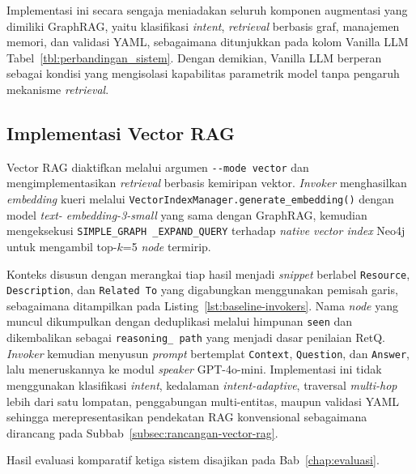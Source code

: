Implementasi ini secara sengaja meniadakan seluruh komponen augmentasi yang dimiliki GraphRAG, yaitu klasifikasi \textit{intent}, \textit{retrieval} berbasis graf, manajemen memori, dan validasi YAML, sebagaimana ditunjukkan pada kolom Vanilla LLM Tabel~\ref{tbl:perbandingan_sistem}. Dengan demikian, Vanilla LLM berperan sebagai kondisi yang mengisolasi kapabilitas parametrik model tanpa pengaruh mekanisme \textit{retrieval}.

\subsection{Implementasi Vector RAG}
\label{subsec:implementasi-vector-rag}

\begin{sloppypar}
Vector RAG diaktifkan melalui argumen \texttt{-{}-mode vector} dan mengimplementasikan \textit{retrieval} berbasis kemiripan vektor. \textit{Invoker} menghasilkan \textit{embedding} kueri melalui \texttt{VectorIndexManager.\allowbreak{}generate\_embedding()} dengan model \textit{text- embedding-3-small} yang sama dengan GraphRAG, kemudian mengeksekusi \texttt{SIMPLE\_GRAPH \_EXPAND\_QUERY} terhadap \textit{native vector index} Neo4j untuk mengambil top-$k$=5 \textit{node} termirip.
\end{sloppypar}

Konteks disusun dengan merangkai tiap hasil menjadi \textit{snippet} berlabel \texttt{Resource}, \texttt{Description}, dan \texttt{Related To} yang digabungkan menggunakan pemisah garis, sebagaimana ditampilkan pada Listing~\ref{lst:baseline-invokers}. Nama \textit{node} yang muncul dikumpulkan dengan deduplikasi melalui himpunan \texttt{seen} dan dikembalikan sebagai \texttt{reasoning\_ path} yang menjadi dasar penilaian RetQ. \textit{Invoker} kemudian menyusun \textit{prompt} bertemplat \texttt{Context}, \texttt{Question}, dan \texttt{Answer}, lalu meneruskannya ke modul \textit{speaker} GPT-4o-mini. Implementasi ini tidak menggunakan klasifikasi \textit{intent}, kedalaman \textit{intent-adaptive}, traversal \textit{multi-hop} lebih dari satu lompatan, penggabungan multi-entitas, maupun validasi YAML sehingga merepresentasikan pendekatan RAG konvensional sebagaimana dirancang pada Subbab~\ref{subsec:rancangan-vector-rag}.



Hasil evaluasi komparatif ketiga sistem disajikan pada Bab~\ref{chap:evaluasi}.
